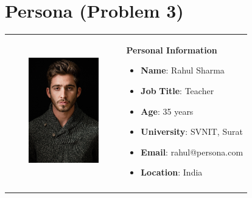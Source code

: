\documentclass[paper=a4, fontsize=11pt]{report}
\numberwithin{equation}{section}		%
\numberwithin{figure}{section}			%
\numberwithin{table}{section}				%
\begin{document}

\chapter{\gls{Persona} (Problem 3)}
\vspace{\baselineskip}



\begin{table}[H]
 			\centering
\begin{tabular}{p{1.86in}p{4.23in}}
\hline

\multicolumn{1}{|p{1.86in}}{
	\begin{Center}
		\includegraphics[width=1.86in,height=1.8in]{teacher.jpg}
	\end{Center}
 \par } & 
\multicolumn{1}{|p{4.23in}|}{{\fontsize{10pt}{12.0pt}\selectfont \textbf{Personal Information}} \par \begin{itemize}
	\item {\fontsize{10pt}{12.0pt}\selectfont \textbf{Name}: Rahul Sharma} \par 	\item {\fontsize{10pt}{12.0pt}\selectfont \textbf{Job} \textbf{Title}: Teacher} \par 	\item {\fontsize{10pt}{12.0pt}\selectfont \textbf{Age}: 35 years} \par 	\item {\fontsize{10pt}{12.0pt}\selectfont \textbf{University}: SVNIT, Surat} \par 	\item {\fontsize{10pt}{12.0pt}\selectfont \textbf{Email}: rahul@persona.com} \par 	\item {\fontsize{10pt}{12.0pt}\selectfont \textbf{Location}: India}
\end{itemize} \par } \\
\hhline{--}


\end{tabular}
\end{table}
\end{document}
